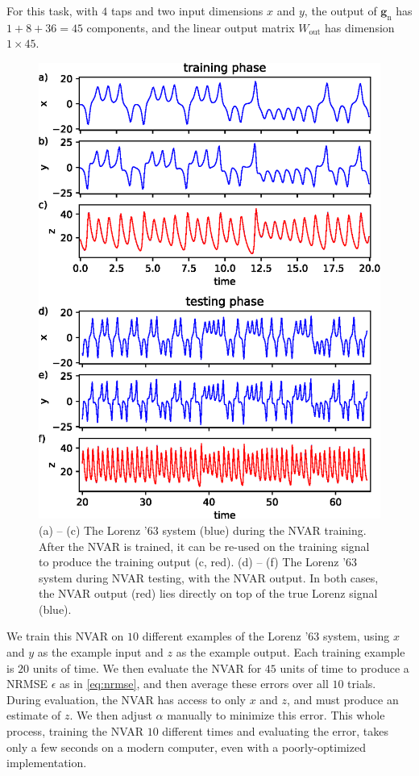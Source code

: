 For this task, with $4$ taps and two input dimensions $x$ and $y$, the
output of $\bm{g}_\text{n}$ has $1 + 8 + 36 = 45$ components, and the linear
output matrix $W_\text{out}$ has dimension $1 \times 45$.

\begin{figure}
  \includegraphics{figures/nvar-infer-lorenz}
  \caption{(a) -- (c) The Lorenz '63 system (blue) during the NVAR
    training. After the NVAR is trained, it can be re-used on the
    training signal to produce the training output (c, red). (d) --
    (f) The Lorenz '63 system during NVAR testing, with the NVAR
    output. In both cases, the NVAR output (red) lies directly on top
    of the true Lorenz signal (blue).}
  \label{fig:nvar-infer-lorenz}
\end{figure}

We train this NVAR on $10$ different examples of the Lorenz '63
system, using $x$ and $y$ as the example input and $z$ as the example
output. Each training example is $20$ units of time. We then evaluate
the NVAR for $45$ units of time to produce a NRMSE $\epsilon$ as in
\cref{eq:nrmse}, and then average these errors over all $10$
trials. During evaluation, the NVAR has access to only $x$ and $z$,
and must produce an estimate of $z$. We then adjust $\alpha$ manually
to minimize this error. This whole process, training the NVAR $10$
different times and evaluating the error, takes only a few seconds on
a modern computer, even with a poorly-optimized implementation.

